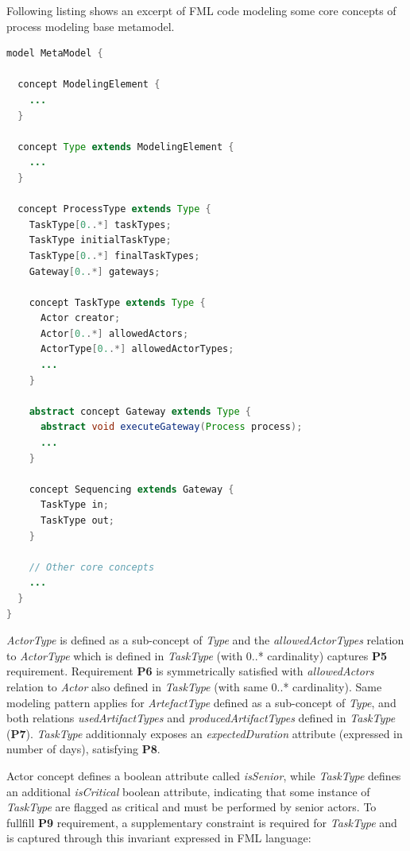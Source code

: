 Following listing shows an excerpt of FML code modeling some core concepts of process modeling base metamodel. 

\begin{lstlisting}[breaklines=true, language=java, basicstyle=\ttfamily\scriptsize, mathescape=true]
model MetaModel {

  concept ModelingElement {
    ...
  }
  
  concept Type extends ModelingElement {
    ...
  }
  
  concept ProcessType extends Type {
    TaskType[0..*] taskTypes;
    TaskType initialTaskType;
    TaskType[0..*] finalTaskTypes;
    Gateway[0..*] gateways;
        
    concept TaskType extends Type {
      Actor creator;
      Actor[0..*] allowedActors;
      ActorType[0..*] allowedActorTypes;
      ...
    }
        
    abstract concept Gateway extends Type {
      abstract void executeGateway(Process process);
      ...
    }
        
    concept Sequencing extends Gateway {
      TaskType in;
      TaskType out;
    }
    
    // Other core concepts
    ...
  }
}    
\end{lstlisting}


\textit{ActorType} is defined as a sub-concept of \textit{Type} and the \textit{allowedActorTypes} relation to \textit{ActorType} which is defined in \textit{TaskType} (with 0..* cardinality) captures \textbf{P5} requirement. Requirement \textbf{P6} is symmetrically satisfied with \textit{allowedActors} relation to \textit{Actor} also defined in \textit{TaskType} (with same 0..* cardinality). Same modeling pattern applies for \textit{ArtefactType} defined as a sub-concept of \textit{Type}, and both relations \textit{usedArtifactTypes} and \textit{producedArtifactTypes} defined in \textit{TaskType} (\textbf{P7}). \textit{TaskType} additionnaly exposes an \textit{expectedDuration} attribute (expressed in number of days), satisfying \textbf{P8}. 

Actor concept defines a boolean attribute called \textit{isSenior}, while \textit{TaskType} defines an additional \textit{isCritical} boolean attribute, indicating that some instance of \textit{TaskType} are flagged as critical and must be performed by senior actors. To fullfill \textbf{P9} requirement, a supplementary constraint is required for \textit{TaskType} and is captured through this invariant expressed in FML language:

